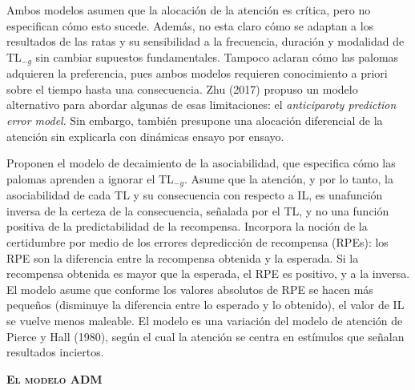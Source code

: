\documentclass[a4paper,12pt]{article}
\begin{document}
Ambos modelos asumen que la alocación de la atención es crítica, pero no especifican cómo esto sucede. Además, no esta claro cómo se adaptan a los resultados de las ratas y su sensibilidad a la frecuencia, duración y modalidad de TL$_{-g}$ sin cambiar supuestos fundamentales. Tampoco aclaran cómo las palomas adquieren la preferencia, pues ambos modelos requieren conocimiento a priori sobre el tiempo hasta una consecuencia.  Zhu (2017) propuso un modelo alternativo para abordar algunas de esas limitaciones: el {\itshape anticiparoty prediction error model}. Sin embargo, también presupone una alocación diferencial de la atención sin explicarla con dinámicas ensayo por ensayo.

Proponen el modelo de decaimiento de la asociabilidad, que especifica cómo las palomas aprenden a ignorar el TL$_{-g}$. Asume que la atención, y por lo tanto, la asociabilidad de cada TL y su consecuencia con respecto a IL, es unafunción inversa de la certeza de la consecuencia, señalada por el TL, y no una función positiva de la predictabilidad de la recompensa. Incorpora la noción de la certidumbre por medio de los errores depredicción de recompensa (RPEs): los RPE son la diferencia entre la recompensa obtenida y la esperada. Si la recompensa obtenida es mayor que la esperada, el RPE es positivo, y a la inversa. El modelo asume que conforme los valores absolutos de RPE se hacen más pequeños (disminuye la diferencia entre lo esperado y lo obtenido), el valor de IL se vuelve menos maleable. El modelo es una variación del modelo de atención de Pierce y Hall (1980), según el cual la atención se centra en estímulos que señalan resultados inciertos.

{\scshape\bfseries El modelo ADM}
\end{document}
